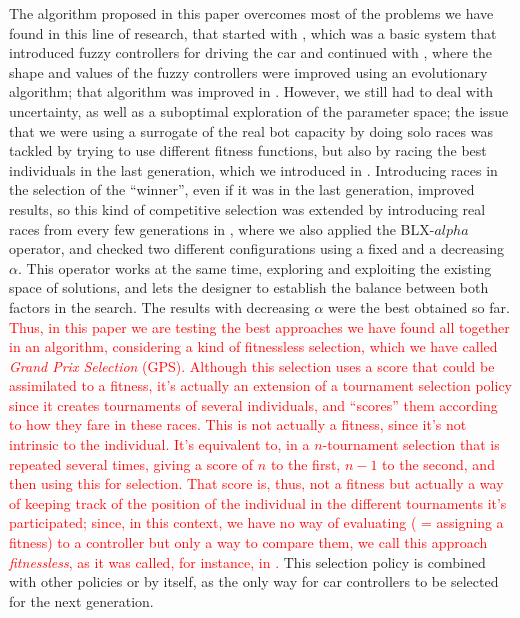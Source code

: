 \documentclass[10pt,journal,compsoc]{IEEEtran}
\begin{document}
The algorithm proposed in this paper overcomes most of the problems we
have found in this line of research, that started with
\cite{salem_evo17}, which was a basic system that
introduced fuzzy controllers for driving the car and continued with
\cite{salem_evo18}, where the shape and values of the
fuzzy controllers were improved using an evolutionary algorithm; that
algorithm was improved in \cite{salem_ipmu18}. However,
we still had to deal with uncertainty, as well as a suboptimal exploration of the parameter space; the issue that we were using a
surrogate of the real bot capacity by doing solo races was tackled by
trying to use different fitness functions, but also by racing the best
individuals in the last generation, which we introduced in
\cite{salem_cig2018}. Introducing races in the selection of the
``winner'', even if it was in the last generation, improved results,
so this kind of competitive selection was extended by introducing real
races from every few generations in 
\cite{DBLP:conf/cig/SalemMG19}, where we also applied the BLX-$alpha$ operator, and checked two different configurations using a fixed and a decreasing $\alpha$. This operator works at the same time, exploring and exploiting the existing space of solutions, and lets the designer to establish the balance between both factors in the search. The results with decreasing $\alpha$ were the best obtained so far.
\textcolor{red}{
Thus, in this paper we are testing the best approaches we have found all together in an algorithm, considering a kind of fitnessless selection, which we have called \textit{Grand Prix Selection} (GPS). Although this selection uses a score that could be assimilated to a fitness, it's actually an extension of a tournament selection policy since it creates tournaments of several individuals, and ``scores'' them according to how they fare in these races. This is not actually a fitness, since it's not intrinsic to the individual. It's equivalent to, in a $n$-tournament selection that is repeated several times, giving a score of $n$ to the first, $n-1$ to the second, and then using this for selection. That score is, thus, not a fitness but actually a way of keeping track of the position of the individual in the different tournaments it's participated; since, in this context, we have no way of evaluating ( = assigning a fitness) to a controller but only a way to compare them, we call this approach {\em fitnessless}, as it was called, for instance, in \cite{jaskowski2008winning}.
}
This selection policy is combined with other policies or by itself, as the only way for car controllers to be selected for the next generation.
\end{document}
